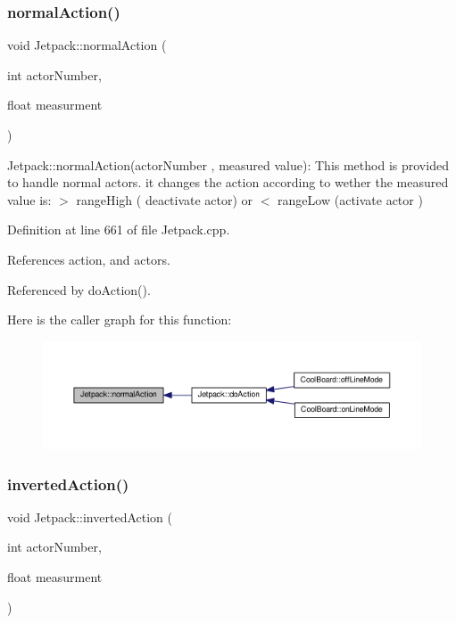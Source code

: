 \subsubsection{\texorpdfstring{normal\+Action()}{normalAction()}}
{\footnotesize\ttfamily void Jetpack\+::normal\+Action (\begin{DoxyParamCaption}\item[{int}]{actor\+Number,  }\item[{float}]{measurment }\end{DoxyParamCaption})}

Jetpack\+::normal\+Action(actor\+Number , measured value)\+: This method is provided to handle normal actors. it changes the action according to wether the measured value is\+: $>$ range\+High ( deactivate actor) or $<$ range\+Low (activate actor ) 

Definition at line 661 of file Jetpack.\+cpp.



References action, and actors.



Referenced by do\+Action().

Here is the caller graph for this function\+:
\nopagebreak
\begin{figure}[H]
\begin{center}
\leavevmode
\includegraphics[width=350pt]{df/d1d/class_jetpack_a65ce9533c39fa71e4945b970bf14b980_icgraph}
\end{center}
\end{figure}
\mbox{\label{class_jetpack_adacfc35fab4a621357caf98ce1c9cb54}} 
\subsubsection{\texorpdfstring{inverted\+Action()}{invertedAction()}}
{\footnotesize\ttfamily void Jetpack\+::inverted\+Action (\begin{DoxyParamCaption}\item[{int}]{actor\+Number,  }\item[{float}]{measurment }\end{DoxyParamCaption})}

